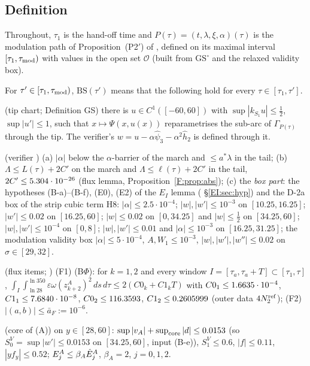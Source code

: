 \documentclass[11pt]{article}
\begin{document}
\subsection{Definition}
Throughout, $\tau_1$ is the hand-off time and $P(\tau)=(t,\lambda,\xi,\alpha)(\tau)$ is the modulation path of Proposition~(P2$'$) of , defined on its maximal interval $[\tau_1,\tau_{\rm mod})$ with values in the open set $\mathcal O$ (built from $\mathrm{GS}^\circ$ and the relaxed validity box).
\begin{definition}\label{BS:def}
For $\tau'\in[\tau_1,\tau_{\rm mod})$, $\mathrm{BS}(\tau')$ means that the following hold for every $\tau\in[\tau_1,\tau']$.
\begin{description}[leftmargin=1.3em,itemsep=2pt]
\item[GS] (tip chart;  Definition GS) there is $u\in C^1([-60,60])$ with $\sup|k_{S_1}u|\le\frac12$, $\sup|u'|\le1$, such that $x\mapsto\Psi(x,u(x))$ reparametrises the sub-arc of $\Gamma_{P(\tau)}$ through the tip. The verifier's $w=u-\alpha\hat\psi_3-\alpha^2\hat h_2$ is defined through it.
\item[B1] (verifier ) (a) $|\alpha|$ below the $\alpha$-barrier of the march and $\le a^*\lambda$ in the tail; (b) $\Lambda\le L(\tau)+2C'$ on the march and $\Lambda\le\ell(\tau)+2C'$ in the tail, $2C'\le5.304\cdot10^{-26}$ (flux lemma, Proposition~\ref{F:prop:abs}); (c) the \emph{box part}: the hypotheses (B-a)--(B-f), (E0), (E2) of the $E_I$ lemma ( \S\ref{EI:sec:hyp}) and the D-2a box of the strip cubic term H8: $|\alpha|\le2.5\cdot10^{-4}$; $|w|,|w'|\le10^{-3}$ on $[10.25,16.25]$; $|w'|\le0.02$ on $[16.25,60]$; $|w|\le0.02$ on $[0,34.25]$ and $|w|\le\frac12$ on $[34.25,60]$; $|w|,|w'|\le10^{-4}$ on $[0,8]$; $|w|,|w'|\le0.01$ and $|\alpha|\le10^{-3}$ on $[16.25,31.25]$; the modulation validity box $|\alpha|\le5\cdot10^{-4}$, $A,W_1\le10^{-3}$, $|w|,|w'|,|w''|\le0.02$ on $\sigma\in[29,32]$.
\item[BF] (flux items; ) (F1) (B$\Phi$): for $k=1,2$ and every window $I=[\tau_a,\tau_a+T]\subset[\tau_1,\tau]$, $\int_I\int_{\ln28}^{\ln350}\varepsilon\omega(z^A_{k+2})^2\,ds\,d\tau\le2(C0_k+C1_kT)$ with $C0_1\le1.6635\cdot10^{-4}$, $C1_1\le7.6840\cdot10^{-8}$, $C0_2\le116.3593$, $C1_2\le0.2605999$ (outer data $4N_2^{\rm ref}$); (F2) $|(a,b)|\le\bar a_F:=10^{-6}$.
\item[B2$'$] (core of (A)) on $y\in[28,60]$: $\sup|v_A|+\sup_{\rm core}|d|\le0.0153$ (so $S^V_0=\sup|w'|\le0.0153$ on $[34.25,60]$, input (B-e)), $S^V_1\le0.6$, $|f|\le0.11$, $|yf_y|\le0.52$; $E^A_j\le\beta_A\hat E^A_j$, $\beta_A=2$, $j=0,1,2$.

\end{description}
\end{definition}
\end{document}
